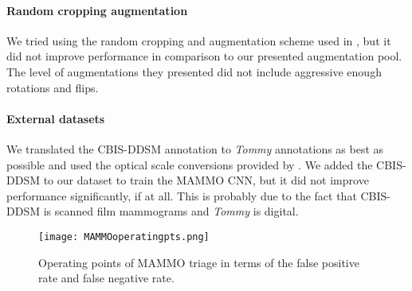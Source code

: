 \documentclass[journal]{IEEEtran}
\begin{document}
\paragraph{Random cropping augmentation} We tried using the random cropping and augmentation scheme used in \cite{krysztof-etal-2017}, but it did not improve performance in comparison to our presented augmentation pool. The level of augmentations they presented did not include aggressive enough rotations and flips.  
\paragraph{External datasets} We translated the CBIS-DDSM annotation to \textit{Tommy} annotations as best as possible and used the optical scale conversions provided by \cite{ddsm-database1, ddsm-database2}.  We added the CBIS-DDSM to our dataset to train the MAMMO CNN, but it did not improve performance significantly, if at all. This is probably due to the fact that CBIS-DDSM is scanned film mammograms and \textit{Tommy} is digital.

\begin{figure}[t]
\centering
  \texttt{[image: MAMMOoperatingpts.png]}
  \caption{Operating points of MAMMO triage in terms of the false positive rate and false negative rate. }
  \label{fig:MAMMOoperating}
\end{figure}
\end{document}
